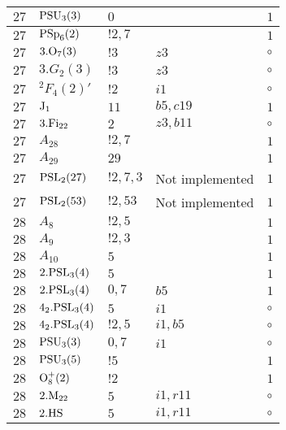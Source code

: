 \documentclass[a4paper, 11pt]{article}
\begin{document}
\begin{longtable}{lllll}
        $ 27 $ & $ {\rm PSU}_{3}(3) $ & $ 0 $ & $ ~ $ & $ 1$ \\ \hline
        $ 27 $ & $ {\rm PSp}_{6}(2) $ & $ ! 2,7 $ & $ ~ $ & $ 1$ \\ \hline
        $ 27 $ & $ 3.{\rm O}_{7}(3) $ & $ ! 3 $ & $ z3 $ &  $\circ$ \\ \hline
        $ 27 $ & $ 3.G_{2}(3) $ & $ ! 3 $ & $ z3 $ &  $\circ$ \\ \hline
        $ 27 $ & $ {}^2F_4(2)' $ & $ ! 2 $ & $ i1 $ &  $\circ$ \\ \hline
        $ 27 $ & $ {\rm J}_1 $ & $ 11 $ & $ b5, c19 $ & $ 1$ \\ \hline
        $ 27 $ & $ 3.{\rm Fi}_{22} $ & $ 2 $ & $ z3, b11 $ &  $\circ$ \\ \hline
        $ 27 $ & $ A_{28} $ & $ !2, 7 $ & $ ~ $ & $ 1$ \\ \hline
        $ 27 $ & $ A_{29} $ & $ 29 $ & $ ~ $ & $ 1$ \\ \hline
        $ 27 $ & $ {\rm PSL}_{2}(27) $ & $ !2, 7, 3 $ &  Not implemented & $ 1$ \\ \hline
        $ 27 $ & $ {\rm PSL}_{2}(53) $ & $ !2, 53 $ &  Not implemented & $ 1$ \\ \hline
        $ 28 $ & $ A_{8} $ & $ ! 2,5 $ & $ ~ $ & $ 1$ \\ \hline
        $ 28 $ & $ A_{9} $ & $ ! 2,3 $ & $ ~ $ & $ 1$ \\ \hline
        $ 28 $ & $ A_{10} $ & $ 5 $ & $ ~ $ & $ 1$ \\ \hline
        $ 28 $ & $ 2.{\rm PSL}_{3}(4) $ & $ 5 $ & $ ~ $ & $ 1$ \\ \hline
        $ 28 $ & $ 2.{\rm PSL}_{3}(4) $ & $ 0,7 $ & $ b5 $ & $ 1$ \\ \hline
        $ 28 $ & $ 4_2.{\rm PSL}_{3}(4) $ & $ 5 $ & $ i1 $ &  $\circ$ \\ \hline
        $ 28 $ & $ 4_2.{\rm PSL}_{3}(4) $ & $ ! 2,5 $ & $ i1, b5 $ &  $\circ$ \\ \hline
        $ 28 $ & $ {\rm PSU}_{3}(3) $ & $ 0,7 $ & $ i1 $ &  $\circ$ \\ \hline
        $ 28 $ & $ {\rm PSU}_{3}(5) $ & $ ! 5 $ & $ ~ $ & $ 1$ \\ \hline
        $ 28 $ & $ {\rm O}_{8}^+(2) $ & $ ! 2 $ & $ ~ $ & $ 1$ \\ \hline
        $ 28 $ & $ 2.{\rm M}_{22} $ & $ 5 $ & $ i1, r11 $ &  $\circ$ \\ \hline
        $ 28 $ & $ 2.{\rm HS} $ & $ 5 $ & $ i1, r11 $ &  $\circ$ \\ \hline

\end{longtable}
\end{document}
